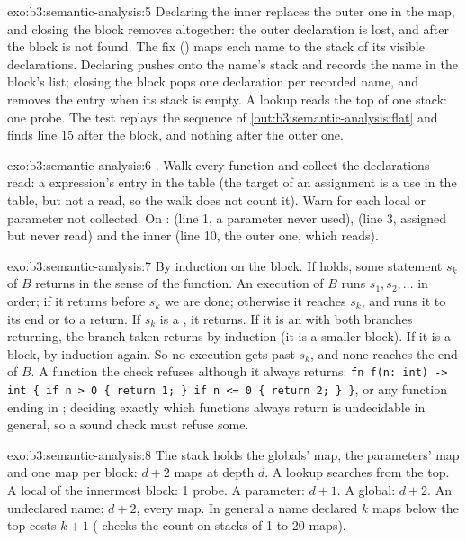 \begin{solution}{exo:b3:semantic-analysis:5}
Declaring the inner  replaces the outer one in the map, and closing the block removes  altogether: the outer declaration is lost, and after the block  is not found. The fix () maps each name to the stack of its visible declarations. Declaring pushes onto the name's stack and records the name in the block's list; closing the block pops one declaration per recorded name, and removes the entry when its stack is empty. A lookup reads the top of one stack: one probe. The test replays the sequence of \cref{out:b3:semantic-analysis:flat} and finds line 15 after the block, and nothing after the outer one.
\end{solution}

\begin{solution}{exo:b3:semantic-analysis:6}
. Walk every function and collect the declarations read: a  expression's entry in the  table (the target of an assignment is a use in the table, but not a read, so the walk does not count it). Warn for each local or parameter not collected. On :  (line 1, a parameter never used),  (line 3, assigned but never read) and the inner  (line 10,  the outer one, which  reads).
\end{solution}

\begin{solution}{exo:b3:semantic-analysis:7}
By induction on the block. If  holds, some statement $s_k$ of $B$ returns in the sense of the function. An execution of $B$ runs $s_1, s_2, \dots$ in order; if it returns before $s_k$ we are done; otherwise it reaches $s_k$, and runs it to its end or to a return. If $s_k$ is a , it returns. If it is an  with both branches returning, the branch taken returns by induction (it is a smaller block). If it is a block, by induction again. So no execution gets past $s_k$, and none reaches the end of $B$. A function the check refuses although it always returns: \texttt{fn f(n:\ int) -> int \{ if n > 0 \{ return 1; \} if n <= 0 \{ return 2; \} \}}, or any function ending in ; deciding exactly which functions always return is undecidable in general, so a sound check must refuse some.
\end{solution}

\begin{solution}{exo:b3:semantic-analysis:8}
The stack holds the globals' map, the parameters' map and one map per block: $d + 2$ maps at depth $d$. A lookup searches from the top. A local of the innermost block: 1 probe. A parameter: $d + 1$. A global: $d + 2$. An undeclared name: $d + 2$, every map. In general a name declared $k$ maps below the top costs $k + 1$ ( checks the count on stacks of 1 to 20 maps).
\end{solution}

